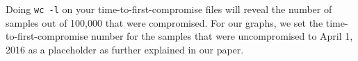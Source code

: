 \documentclass{article}
\begin{document}
Doing {\tt wc -l} on your time-to-first-compromise files will reveal the number 
of samples out of 100,000 that were compromised. For our graphs, we set the 
time-to-first-compromise number for the samples that were uncompromised to 
April 1, 2016 as a placeholder as further explained in our paper.

\printbibliography
\end{document}

